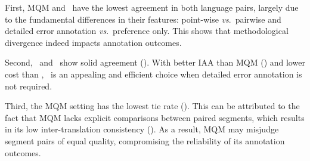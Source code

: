 \begin{table}[t]
    \fontsize{5}{6}\selectfont
    \centering
    \caption{Segment pairwise ranking agreement between every two annotation settings. Results are based on \textit{z}-scores with the \ZhEn~outlier annotator being excluded.
    }
    \label{tab:segment_PRA}
    \vspace{-5pt}
\end{table}

First, MQM and \sxsqr~have the lowest agreement in both language pairs, largely due to the fundamental differences in their features: point-wise \textit{vs}.\ pairwise and detailed error annotation \textit{vs}.\ preference only. This shows that methodological divergence indeed impacts annotation outcomes.

Second, \sxsmqm~and \sxsqr~show solid agreement (). With better IAA than MQM () and lower cost than \sxsmqm, \sxsqr~is an appealing and efficient choice when detailed error annotation is not required.

Third, the MQM setting has the lowest tie rate (). This can be attributed to the fact that MQM lacks explicit comparisons between paired segments, which results in its low inter-translation consistency (). As a result, MQM may misjudge segment pairs of equal quality, compromising the reliability of its annotation outcomes.

